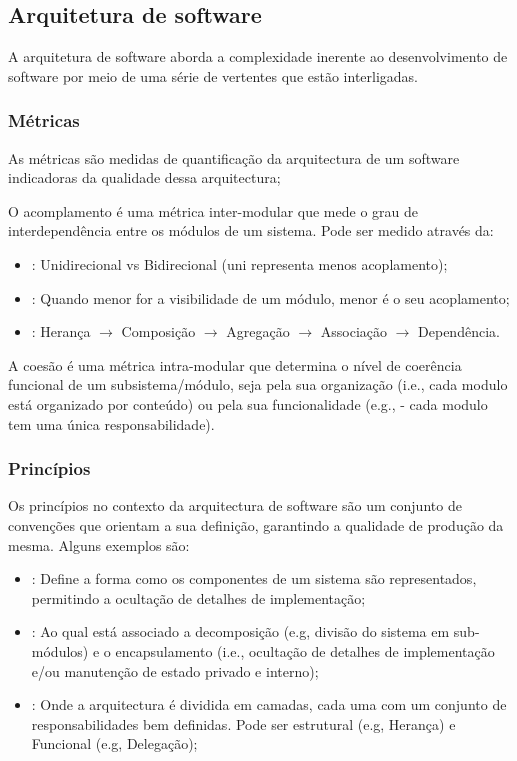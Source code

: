 \subsection{Arquitetura de software}\label{subsec:arquitetura-de-software}

A arquitetura de software aborda a complexidade inerente ao desenvolvimento de software por meio de uma série de vertentes que estão interligadas. 

\subsubsection{Métricas}\label{subsubsec:acoplamento}

As métricas são medidas de quantificação da arquitectura de um software indicadoras da qualidade dessa arquitectura;

O acomplamento é uma métrica inter-modular que mede o grau de interdependência entre os módulos de um sistema. Pode ser medido através da:
\begin{itemize}[topsep=0pt,itemsep=0pt,partopsep=0pt, parsep=0pt]
    \item {}: Unidirecional vs Bidirecional (uni representa menos acoplamento);
    \item {}: Quando menor for a visibilidade de um módulo, menor é o  seu acoplamento;
    \item {}: Herança $\rightarrow$ Composição $\rightarrow$ Agregação $\rightarrow$ Associação $\rightarrow$ Dependência.
\end{itemize}

A coesão é uma métrica intra-modular que determina o nível de coerência funcional de um subsistema/módulo, seja pela sua organização (i.e., cada modulo está organizado por conteúdo) ou pela sua funcionalidade (e.g.,  - cada modulo tem uma única responsabilidade).

\subsubsection{Princípios}\label{subsubsec:principios}

Os princípios no contexto da arquitectura de software são um conjunto de convenções que orientam a sua definição, garantindo a qualidade de produção da mesma. Alguns exemplos são:
\begin{itemize}[topsep=0pt,itemsep=0pt,partopsep=0pt, parsep=0pt]
    \item {}: Define a forma como os componentes de um sistema são representados, permitindo a ocultação de detalhes de implementação;
    \item {}: Ao qual está associado a decomposição (e.g, divisão do sistema em sub-módulos) e o encapsulamento (i.e., ocultação de detalhes de implementação e/ou manutenção de estado privado e interno);
    \item {}: Onde a arquitectura é dividida em camadas, cada uma com um conjunto de responsabilidades bem definidas. Pode ser estrutural (e.g, Herança) e Funcional (e.g, Delegação);
\end{itemize}
    
